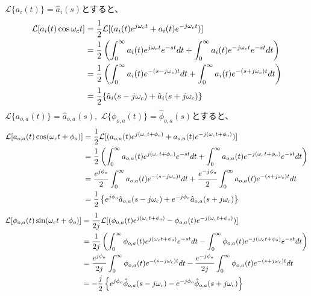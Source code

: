 \documentclass[book]{jlreq}
\begin{document}
%
$\mathcal{L}\{a_i(t)\} = \hat{a}_i(s)$とすると、
%
\begin{align}
    \mathcal{L} [a_i(t)\cos\omega_c t]
     & = \frac{1}{2}\mathcal{L}[(a_i(t) e^{j\omega_c t}+a_i(t) e^{-j\omega_c t})]\notag                                                    \\
     & = \frac{1}{2}\left(\int_0^\infty a_i(t) e^{j\omega_c t} e^{-st} dt + \int_0^\infty a_i(t) e^{-j\omega_c t} e^{-st} dt \right)\notag \\
     & = \frac{1}{2}\left(\int_0^\infty a_i(t) e^{-(s-j\omega_c) t} dt + \int_0^\infty a_i(t) e^{-(s+j\omega_c) t} dt \right)\notag        \\
     & = \frac{1}{2}\{\hat{a}_i(s-j\omega_c) + \hat{a}_i(s+j\omega_c)\}
    \label{eq:lt_ai_cos}
\end{align}
%
$\mathcal{L}\{a_{o,a}(t)\} = \hat{a}_{o,a}(s),\; \mathcal{L}\{\phi_{o,a}(t)\} = \hat{\phi}_{o,a}(s)$とすると、
%
\begin{align}
    \mathcal{L} [a_{o,a}(t)\cos(\omega_c t+\phi_o)]
     & = \frac{1}{2}\mathcal{L}[(a_{o,a}(t) e^{j(\omega_c t+\phi_o)}+a_{o,a}(t) e^{-j(\omega_c t+\phi_o)})]\notag \\
     & = \frac{1}{2}\left(\int_0^\infty a_{o,a}(t) e^{j(\omega_c t+\phi_o)} e^{-st} dt
    + \int_0^\infty a_{o,a}(t) e^{-j(\omega_c t+\phi_o)} e^{-st} dt \right)\notag                                 \\
     & = \frac{e^{j\phi_o}}{2}\int_0^\infty a_{o,a}(t) e^{-(s-j\omega_c) t} dt
    + \frac{e^{-j\phi_o}}{2}\int_0^\infty a_{o,a}(t) e^{-(s+j\omega_c) t} dt\notag                                \\
     & = \frac{1}{2}\left\{e^{j\phi_o}\hat{a}_{o,a}(s-j\omega_c) + e^{-j\phi_o}\hat{a}_{o,a}(s+j\omega_c)\right\}
\end{align}
%
\begin{align}
    \mathcal{L} [\phi_{o,a}(t)\sin(\omega_c t+\phi_o)]
     & = \frac{1}{2j}\mathcal{L}[(\phi_{o,a}(t) e^{j(\omega_c t+\phi_o)} - \phi_{o,a}(t) e^{-j(\omega_c t+\phi_o)})]\notag \\
     & = \frac{1}{2j}\left(\int_0^\infty \phi_{o,a}(t) e^{j(\omega_c t+\phi_o)} e^{-st} dt
    - \int_0^\infty \phi_{o,a}(t) e^{-j(\omega_c t+\phi_o)} e^{-st} dt \right)\notag                                       \\
     & = \frac{e^{j\phi_o}}{2j}\int_0^\infty \phi_{o,a}(t) e^{-(s-j\omega_c) t} dt
    - \frac{e^{-j\phi_o}}{2j}\int_0^\infty \phi_{o,a}(t) e^{-(s+j\omega_c) t} dt\notag                                     \\
     & = -\frac{j}{2}\left\{e^{j\phi_o}\hat{\phi}_{o,a}(s-j\omega_c) - e^{-j\phi_o} \hat{\phi}_{o,a}(s+j\omega_c)\right\}
\end{align}
\end{document}
